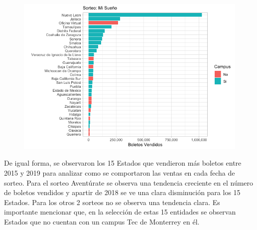 \begin{figure}[H]
    \label{fig:bolvendidos2}
    \includegraphics[scale = 0.5]{Imagenes/boletos_sue.png} \\
    \centering
\end{figure} 

De igual forma, se observaron los 15 Estados que vendieron más boletos entre 2015 y 2019 para analizar como se comportaron las ventas en cada fecha de sorteo. Para el sorteo Aventúrate se observa una tendencia creciente en el número de boletos vendidos  y apartir de 2018 se ve una clara disminución para los 15 Estados. Para los otros 2 sorteos no se observa una tendencia clara. Es importante mencionar que, en la selección de estas 15 entidades se observan Estados que no cuentan con un campus Tec de Monterrey en él.

